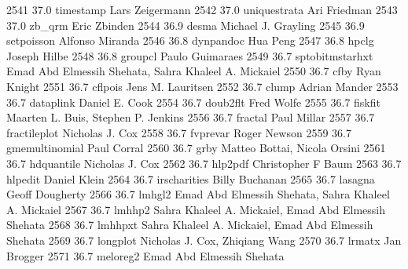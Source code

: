   2541     37.0    timestamp     Lars Zeigermann                         
  2542     37.0    uniquestrata  Ari Friedman                            
  2543     37.0    zb_qrm        Eric Zbinden                            
  2544     36.9    desma         Michael J. Grayling                     
  2545     36.9    setpoisson    Alfonso Miranda                         
  2546     36.8    dynpandoc     Hua Peng                                
  2547     36.8    hpclg         Joseph Hilbe                            
  2548     36.8    groupcl       Paulo Guimaraes                         
  2549     36.7    sptobitmstarhxt  Emad Abd Elmessih Shehata, Sahra        
                                   Khaleel A. Mickaiel                     
  2550     36.7    cfby          Ryan Knight                             
  2551     36.7    cflpois       Jens M. Lauritsen                       
  2552     36.7    clump         Adrian Mander                           
  2553     36.7    dataplink     Daniel E. Cook                          
  2554     36.7    doub2flt      Fred Wolfe                              
  2555     36.7    fiskfit       Maarten L. Buis, Stephen P. Jenkins     
  2556     36.7    fractal       Paul Millar                             
  2557     36.7    fractileplot  Nicholas J. Cox                         
  2558     36.7    fvprevar      Roger Newson                            
  2559     36.7    gmemultinomial  Paul Corral                             
  2560     36.7    grby          Matteo Bottai, Nicola Orsini            
  2561     36.7    hdquantile    Nicholas J. Cox                         
  2562     36.7    hlp2pdf       Christopher F Baum                      
  2563     36.7    hlpedit       Daniel Klein                            
  2564     36.7    irscharities  Billy Buchanan                          
  2565     36.7    lasagna       Geoff Dougherty                         
  2566     36.7    lmhgl2        Emad Abd Elmessih Shehata, Sahra        
                                   Khaleel A. Mickaiel                     
  2567     36.7    lmhhp2        Sahra Khaleel A. Mickaiel, Emad Abd     
                                   Elmessih Shehata                        
  2568     36.7    lmhhpxt       Sahra Khaleel A. Mickaiel, Emad Abd     
                                   Elmessih Shehata                        
  2569     36.7    longplot      Nicholas J. Cox, Zhiqiang Wang          
  2570     36.7    lrmatx        Jan Brogger                             
  2571     36.7    meloreg2      Emad Abd Elmessih Shehata               

